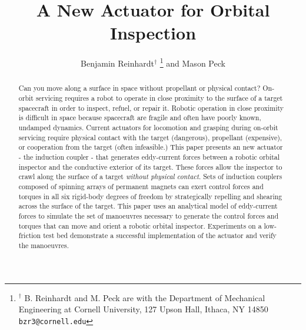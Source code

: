 \documentclass[letterpaper, 10 pt, conference]{ieeeconf}  %
\title{\LARGE \bf
A New Actuator for Orbital Inspection 
}
\author{Benjamin Reinhardt$^{\dag}$ 
\thanks{$^{\dag}$ B. Reinhardt and M. Peck are with the Department of Mechanical Engineering at Cornell University, 127 Upson Hall, Ithaca, NY 14850 {\tt\small bzr3@cornell.edu}}%
and Mason Peck%
}
\begin{document}
\maketitle
\thispagestyle{empty}
\pagestyle{empty}


\begin{abstract}

Can you move along a surface in space without propellant or physical contact? On-orbit servicing requires a robot to operate in close proximity to the surface of a target spacecraft in order to inspect, refuel, or repair it.  Robotic operation in close proximity is difficult in space because spacecraft are fragile and often have poorly known, undamped dynamics. Current actuators for locomotion and grasping during on-orbit servicing require physical contact with the target (dangerous), propellant (expensive), or cooperation from the target (often infeasible.)   
%
This paper presents an new actuator - the induction coupler - that generates eddy-current forces between a robotic orbital inspector and the conductive exterior of its target. These forces allow the inspector to crawl along the surface of a target \textit{without physical contact}. Sets of induction couplers composed of spinning arrays of permanent magnets can exert control forces and torques in all six rigid-body degrees of freedom by strategically repelling and shearing across the surface of the target. 
%
This paper uses an analytical model of eddy-current forces to simulate the set of manoeuvres necessary to generate the control forces and torques that can move and orient a robotic orbital inspector. Experiments on a low-friction test bed demonstrate a successful implementation of the actuator and verify the manoeuvres.

\end{abstract}


\listoftodos
\end{document}

